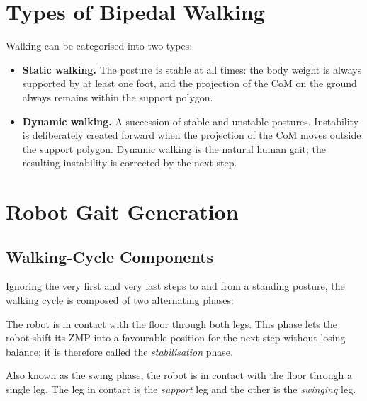 \section{Types of Bipedal Walking}
Walking can be categorised into two types:
\begin{itemize}[itemsep=2pt,topsep=4pt]
  \item \textbf{Static walking.} The posture is stable at all times: the
        body weight is always supported by at least one foot, and the
        projection of the CoM on the ground always remains within the
        support polygon.
  \item \textbf{Dynamic walking.} A succession of stable and unstable
        postures. Instability is deliberately created forward when the
        projection of the CoM moves outside the support polygon. Dynamic
        walking is the natural human gait; the resulting instability is
        corrected by the next step.
\end{itemize}

\section{Robot Gait Generation}

\subsection{Walking-Cycle Components}
Ignoring the very first and very last steps to and from a standing
posture, the walking cycle is composed of two alternating phases:
\begin{description}[itemsep=2pt,topsep=4pt]
  \item[Double-Support Phase (DSP)] The robot is in contact with the
        floor through both legs. This phase lets the robot shift its ZMP
        into a favourable position for the next step without losing
        balance; it is therefore called the \emph{stabilisation} phase.
  \item[Single-Support Phase (SSP)] Also known as the swing phase, the
        robot is in contact with the floor through a single leg. The leg
        in contact is the \emph{support} leg and the other is the
        \emph{swinging} leg.
\end{description}

